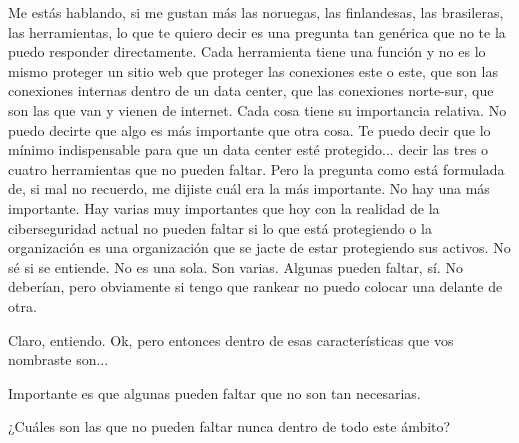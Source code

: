 \begin{description}[leftmargin=0cm, labelsep=0.5cm]
    \item[\textbf{PITA GUILLERMO:}] Me estás hablando, si me gustan más las noruegas, las finlandesas, las brasileras, las herramientas, lo que te quiero decir es una pregunta tan genérica que no te la puedo responder directamente. Cada herramienta tiene una función y no es lo mismo proteger un sitio web que proteger las conexiones este o este, que son las conexiones internas dentro de un data center, que las conexiones norte-sur, que son las que van y vienen de internet. Cada cosa tiene su importancia relativa. No puedo decirte que algo es más importante que otra cosa. Te puedo decir que lo mínimo indispensable para que un data center esté protegido... decir las tres o cuatro herramientas que no pueden faltar. Pero la pregunta como está formulada de, si mal no recuerdo, me dijiste cuál era la más importante. No hay una más importante. Hay varias muy importantes que hoy con la realidad de la ciberseguridad actual no pueden faltar si lo que está protegiendo o la organización es una organización que se jacte de estar protegiendo sus activos. No sé si se entiende. No es una sola. Son varias. Algunas pueden faltar, sí. No deberían, pero obviamente si tengo que rankear no puedo colocar una delante de otra.

    \item[\textbf{MUNTAABSKI FEDERICO:}] Claro, entiendo. Ok, pero entonces dentro de esas características que vos nombraste son...

    \item[\textbf{PITA GUILLERMO:}] Importante es que algunas pueden faltar que no son tan necesarias.

    \item[\textbf{MUNTAABSKI FEDERICO:}] ¿Cuáles son las que no pueden faltar nunca dentro de todo este ámbito?


\end{description}
